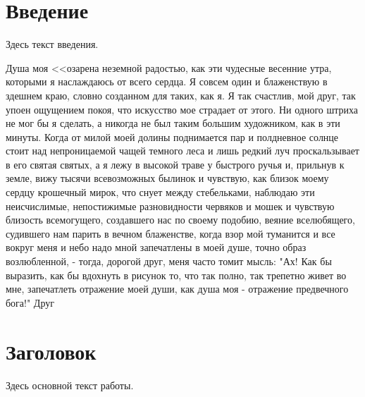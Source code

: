 
\newcommand{\No}{\textnumero}







\maketitle

\tableofcontents

\section*{Введение}
Здесь текст введения.

Душа моя <<озарена неземной радостью, как эти чудесные весенние утра, которыми я наслаждаюсь от всего сердца. Я совсем один и блаженствую в здешнем краю, словно созданном для таких, как я. Я так счастлив, мой друг, так упоен ощущением покоя, что искусство мое страдает от этого. Ни одного штриха не мог бы я сделать, а никогда не был таким большим художником, как в эти минуты. Когда от милой моей долины поднимается пар и полдневное солнце стоит над непроницаемой чащей темного леса и лишь редкий луч проскальзывает в его святая святых, а я лежу в высокой траве у быстрого ручья и, прильнув к земле, вижу тысячи всевозможных былинок и чувствую, как близок моему сердцу крошечный мирок, что снует между стебельками, наблюдаю эти неисчислимые, непостижимые разновидности червяков и мошек и чувствую близость всемогущего, создавшего нас по своему подобию, веяние вселюбящего, судившего нам парить в вечном блаженстве, когда взор мой туманится и все вокруг меня и небо надо мной запечатлены в моей душе, точно образ возлюбленной, - тогда, дорогой друг, меня часто томит мысль: "Ах! Как бы выразить, как бы вдохнуть в рисунок то, что так полно, так трепетно живет во мне, запечатлеть отражение моей души, как душа моя - отражение предвечного бога!" Друг



\section{Заголовок}
Здесь основной текст работы\cite{BookRef, ArticleRef, LinkRef}.

